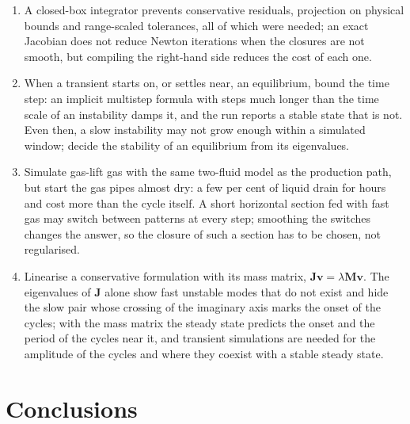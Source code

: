 \documentclass[a4paper,fleqn]{cas-sc}
\newcommand{\bJ}{\mathbf{J}}
\newcommand{\bM}{\mathbf{M}}
\newcommand{\bv}{\mathbf{v}}
\begin{document}
\begin{enumerate}
\item A closed-box integrator prevents conservative residuals, projection on physical bounds and range-scaled tolerances, all of which were needed; an exact Jacobian does not reduce Newton iterations when the closures are not smooth, but compiling the right-hand side reduces the cost of each one.
\item When a transient starts on, or settles near, an equilibrium, bound the time step: an implicit multistep formula with steps much longer than the time scale of an instability damps it, and the run reports a stable state that is not. Even then, a slow instability may not grow enough within a simulated window; decide the stability of an equilibrium from its eigenvalues.
\item Simulate gas-lift gas with the same two-fluid model as the production path, but start the gas pipes almost dry: a few per cent of liquid drain for hours and cost more than the cycle itself. A short horizontal section fed with fast gas may switch between patterns at every step; smoothing the switches changes the answer, so the closure of such a section has to be chosen, not regularised.
\item Linearise a conservative formulation with its mass matrix, $\bJ\bv = \lambda\bM\bv$. The eigenvalues of $\bJ$ alone show fast unstable modes that do not exist and hide the slow pair whose crossing of the imaginary axis marks the onset of the cycles; with the mass matrix the steady state predicts the onset and the period of the cycles near it, and transient simulations are needed for the amplitude of the cycles and where they coexist with a stable steady state.
\end{enumerate}

\section{Conclusions}\label{sec:conclusions}
\end{document}
